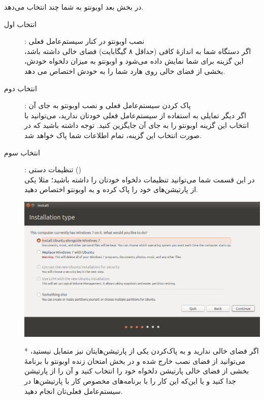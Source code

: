 در بخش بعد اوبونتو به شما چند انتخاب می‌دهد.
\begin{description}
\item[انتخاب اول]: نصب اوبونتو در کنار سیستم‌عامل فعلی\\
اگر دستگاه شما به اندازهٔ کافی (حداقل ۸ گیگابایت) فضای خالی داشته باشد، این 
گزینه برای شما نمایش داده می‌شود و اوبونتو به میزان دلخواه خودش، بخشی از فضای 
خالی روی هارد شما را به خودش اختصاص می دهد.

\item[انتخاب دوم]: پاک کردن سیستم‌عامل فعلی و نصب اوبونتو به جای آن\\
اگر دیگر تمایلی به استفاده از سیستم‌عامل فعلی خودتان ندارید، می‌توانید با انتخاب 
این گزینه اوبونتو را به جای آن جایگزین کنید. توجه داشته باشید که در صورت انتخاب 
این گزینه، تمام اطلاعات شما پاک خواهد شد.

\item[انتخاب سوم]: تنظیمات دستی ()\\
در این قسمت شما می‌توانید تنظیمات دلخواه خودتان را داشته باشید؛ مثلا یکی از 
پارتیشن‌های خود را پاک کرده و به اوبونتو اختصاص دهید.\\
\begin{center}
\includegraphics[scale=0.5]{pics/6.png}\\
\end{center}
* اگر فضای خالی ندارید و به پاک‌کردن یکی  از پارتیشن‌هایتان نیز متمایل نیستید، 
می‌توانید از فضای نصب خارج شده و در بخش امتحان زنده اوبونتو با برنامهٔ 
 بخشی از فضای خالی پارتیشن  دلخواه خود را انتخاب کنید و آن را از 
پارتیشن جدا کنید و یا این‌که این کار را با برنامه‌های مخصوص کار با پارتیشن‌ها در 
سیستم‌عامل فعلی‌تان انجام دهید.
\end{description}

